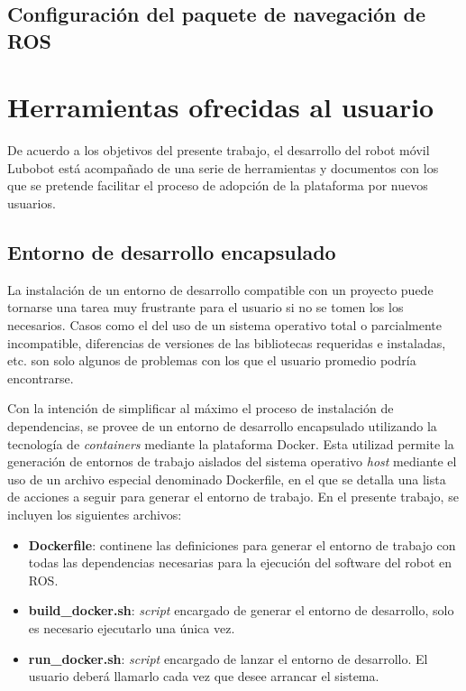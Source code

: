 \subsection{Configuración del paquete de navegación de ROS}


\section{Herramientas ofrecidas al usuario}

De acuerdo a los objetivos del presente trabajo, el desarrollo del robot móvil Lubobot está acompañado de una serie de herramientas y documentos con los que se pretende facilitar el proceso de adopción de la plataforma por nuevos usuarios.

\subsection{Entorno de desarrollo encapsulado}

La instalación de un entorno de desarrollo compatible con un proyecto puede tornarse una tarea muy frustrante para el usuario si no se tomen los los necesarios. Casos como el del uso de un sistema operativo total o parcialmente incompatible, diferencias de versiones de las bibliotecas requeridas e instaladas, etc. son solo algunos de problemas con los que el usuario promedio podría encontrarse.

Con la intención de simplificar al máximo el proceso de instalación de dependencias, se provee de un entorno de desarrollo encapsulado utilizando la tecnología de \textit{containers} mediante la plataforma Docker\protect\footnotemark. Esta utilizad permite la generación de entornos de trabajo aislados del sistema operativo \textit{host} mediante el uso de un archivo especial denominado Dockerfile, en el que se detalla una lista de acciones a seguir para generar el entorno de trabajo. En el presente trabajo, se incluyen los siguientes archivos:

\begin{itemize}
  \item \textbf{Dockerfile}: continene las definiciones para generar el entorno de trabajo con todas las dependencias necesarias para la ejecución del software del robot en ROS.
  \item \textbf{build\_docker.sh}: \textit{script} encargado de generar el entorno de desarrollo, solo es necesario ejecutarlo una única vez.
  \item \textbf{run\_docker.sh}: \textit{script} encargado de lanzar el entorno de desarrollo. El usuario deberá llamarlo cada vez que desee arrancar el sistema.
\end{itemize}

